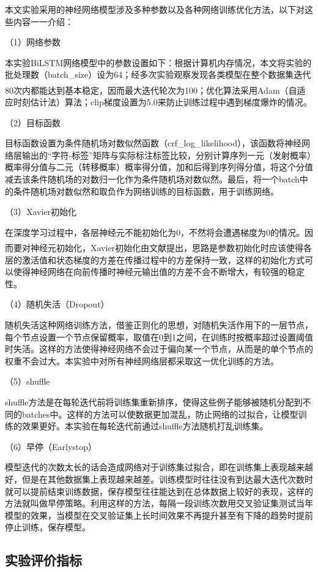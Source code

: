 \documentclass[winfonts,master,oneside,nobackinfo]{njuthesis}
\newcommand{\upcite}[1]{\textsuperscript{\textsuperscript{\cite{#1}}}}
\begin{document}
本文实验采用的神经网络模型涉及多种参数以及各种网络训练优化方法，以下对这些内容一一介绍：

（1）网络参数

本实验BiLSTM网络模型中的参数设置如下：根据计算机内存情况，本文将实验的批处理数（batch\_size）设为64；经多次实验观察发现各类模型在整个数据集迭代80次内都能达到基本稳定，因而最大迭代轮次为100；优化算法采用Adam\upcite{Adam}（自适应时刻估计法）算法；clip梯度设置为5.0来防止训练过程中遇到梯度爆炸的情况。

（2）目标函数

目标函数设置为条件随机场对数似然函数（crf\_log\_likelihood），该函数将神经网络层输出的“字符-标签”矩阵与实际标注标签比较，分别计算序列一元（发射概率）概率得分值与二元（转移概率）概率得分值，加和后得到序列得分值，将这个分值减去该条件随机场的对数归一化作为条件随机场对数似然。最后，将一个batch中的条件随机场对数似然和取负作为网络训练的目标函数，用于训练网络。

（3）Xavier初始化

在深度学习过程中，各层神经元不能初始化为0，不然将会遭遇梯度为0的情况。因而要对神经元初始化，Xavier初始化由文献\upcite{Xavier}提出，思路是参数初始化时应该使得各层的激活值和状态梯度的方差在传播过程中的方差保持一致，这样的初始化方式可以使得神经网络在向前传播时神经元输出值的方差不会不断增大，有较强的稳定性。

（4）随机失活（Dropout）

随机失活这种网络训练方法，借鉴正则化的思想，对随机失活作用下的一层节点，每个节点设置一个节点保留概率，取值在0到1之间，在训练时按概率超过设置阈值时失活。这样的方法使得神经网络不会过于偏向某一个节点，从而是的单个节点的权重不会过大。本实验中对所有神经网络层都采取这一优化训练的方法。

（5）shuffle

shuffle方法是在每轮迭代前将训练集重新排序，使得这些例子能够被随机分配到不同的batches中。这样的方法可以使数据更加混乱，防止网络的过拟合，让模型训练的效果更好。本实验在每轮迭代前通过shuffle方法随机打乱训练集。

（6）早停（Earlystop）

模型迭代的次数太长的话会造成网络对于训练集过拟合，即在训练集上表现越来越好，但是在其他数据集上表现越来越差。训练模型时往往没有到达最大迭代次数时就可以提前结束训练数据，保存模型往往能达到在总体数据上较好的表现，这样的方法就叫做早停策略。利用这样的方法，每隔一段训练次数用交叉验证集测试当年模型的效果，当模型在交叉验证集上长时间效果不再提升甚至有下降的趋势时提前停止训练，保存模型。

\subsection{实验评价指标}
\end{document}
